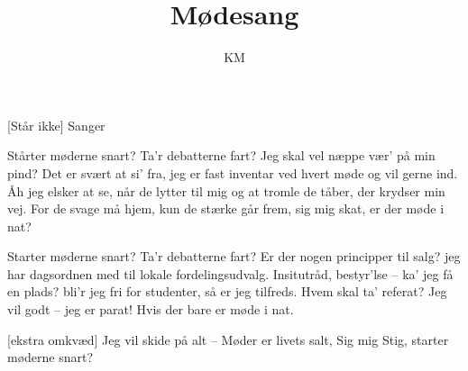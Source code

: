 \documentclass[a4paper,11pt]{article}
\title{Mødesang}
\author{KM}
\begin{document}
\maketitle

\begin{roles}
[Står ikke] Sanger
\end{roles}


\begin{song}
%
Stårter møderne snart?
Ta'r debatterne fart?
Jeg skal vel næppe vær' på min pind?
Det er svært at si' fra,
jeg er fast inventar
ved hvert møde og vil gerne ind.
Åh jeg elsker at se, når de lytter til mig
og at tromle de tåber, der krydser min vej.
For de svage må hjem,
kun de stærke går frem,
sig mig skat, er der møde i nat?

Starter møderne snart?
Ta'r debatterne fart?
Er der nogen principper til salg?
jeg har dagsordnen med
til lokale fordelingsudvalg.
Insitutråd, bestyr'lse -- ka' jeg få en plads?
bli'r jeg fri for studenter, så er jeg tilfreds.
Hvem skal ta' referat?
Jeg vil godt -- jeg er parat!
Hvis der bare er møde i nat.

[ekstra omkvæd]
Jeg vil skide på alt --
Møder er livets salt,
Sig mig Stig, starter møderne snart?
\end{song}
\end{document}
